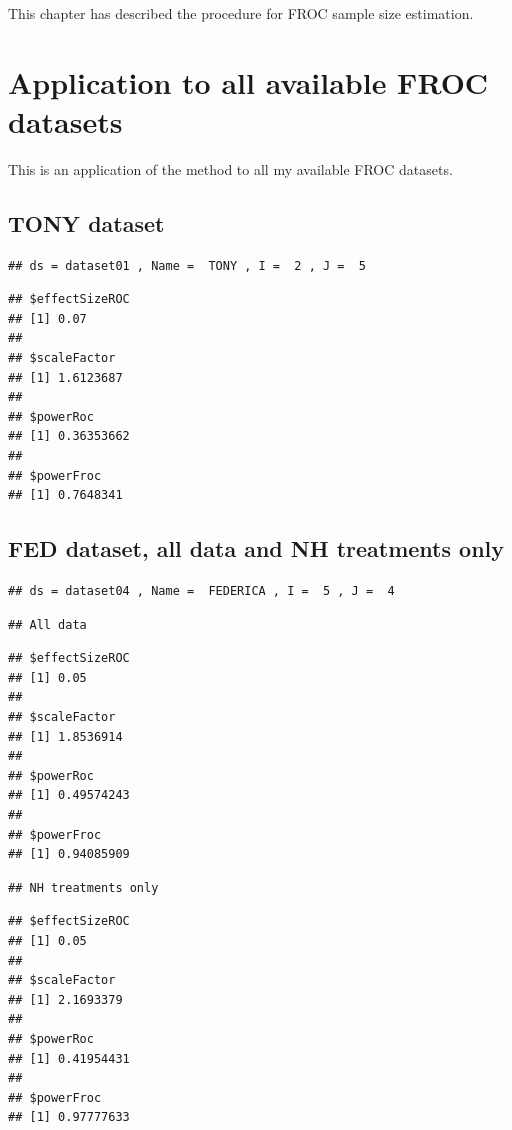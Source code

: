 \documentclass[
]{book}
\begin{document}
This chapter has described the procedure for FROC sample size estimation.

\hypertarget{application-to-all-available-froc-datasets}{%
\section{Application to all available FROC datasets}\label{application-to-all-available-froc-datasets}}

This is an application of the method to all my available FROC datasets.

\hypertarget{tony-dataset}{%
\subsection{TONY dataset}\label{tony-dataset}}

\begin{verbatim}
## ds = dataset01 , Name =  TONY , I =  2 , J =  5
\end{verbatim}

\begin{verbatim}
## $effectSizeROC
## [1] 0.07
## 
## $scaleFactor
## [1] 1.6123687
## 
## $powerRoc
## [1] 0.36353662
## 
## $powerFroc
## [1] 0.7648341
\end{verbatim}

\hypertarget{fed-dataset-all-data-and-nh-treatments-only}{%
\subsection{FED dataset, all data and NH treatments only}\label{fed-dataset-all-data-and-nh-treatments-only}}

\begin{verbatim}
## ds = dataset04 , Name =  FEDERICA , I =  5 , J =  4
\end{verbatim}

\begin{verbatim}
## All data
\end{verbatim}

\begin{verbatim}
## $effectSizeROC
## [1] 0.05
## 
## $scaleFactor
## [1] 1.8536914
## 
## $powerRoc
## [1] 0.49574243
## 
## $powerFroc
## [1] 0.94085909
\end{verbatim}

\begin{verbatim}
## NH treatments only
\end{verbatim}

\begin{verbatim}
## $effectSizeROC
## [1] 0.05
## 
## $scaleFactor
## [1] 2.1693379
## 
## $powerRoc
## [1] 0.41954431
## 
## $powerFroc
## [1] 0.97777633
\end{verbatim}
\end{document}
